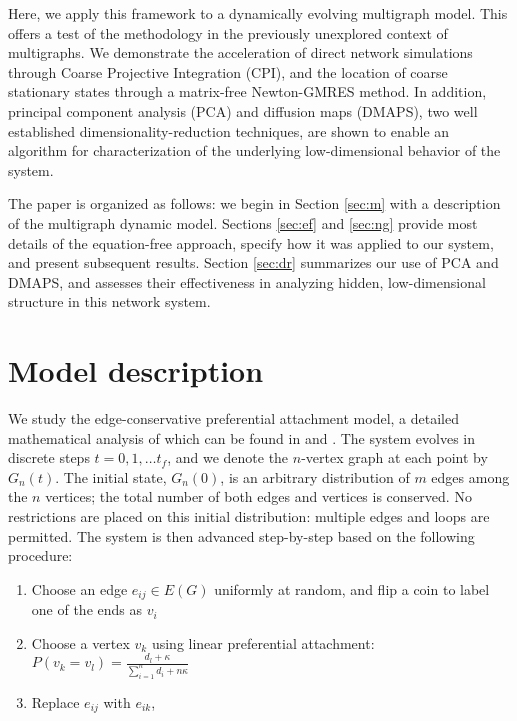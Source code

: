 Here, we apply this framework to a dynamically evolving multigraph
model.
%
This offers a test of the methodology in the previously unexplored
context of multigraphs.
%
We demonstrate the acceleration of direct network simulations through
Coarse Projective Integration (CPI), and the location of coarse
stationary states through a matrix-free Newton-GMRES method.
%
In addition, principal component analysis (PCA) and diffusion maps
(DMAPS), two well established dimensionality-reduction techniques, are
shown to enable an algorithm for characterization of the underlying
low-dimensional behavior of the system. \par

The paper is organized as follows: we begin in Section \ref{sec:m}
with a description of the multigraph dynamic model.
%
Sections \ref{sec:ef} and \ref{sec:ng} provide most details of the
equation-free approach, specify how it was applied to our system, and
present subsequent results.
%
Section \ref{sec:dr} summarizes our use of PCA and DMAPS, and assesses
their effectiveness in analyzing hidden, low-dimensional structure in
this network system.

\section{Model description\label{sec:m}}

We study the edge-conservative preferential attachment model, a
detailed mathematical analysis of which can be found in
\cite{rath_time_2012} and \cite{rath_multigraph_2012}.
%
The system evolves in discrete steps $t = 0,1,\ldots t_f$, and we
denote the $n$-vertex graph at each point by $G_n(t)$.
%
The initial state, $G_n(0)$, is an arbitrary distribution of $m$ edges
among the $n$ vertices; the total number of both edges and vertices is
conserved.
%
No restrictions are placed on this initial distribution: multiple
edges and loops are permitted.  The system is then advanced
step-by-step based on the following procedure:

\begin{enumerate}
\item Choose an edge $e_{ij} \in E(G)$ uniformly at random, and flip a
  coin to label one of the ends as $v_{i}$
\item Choose a vertex $v_{k}$ using linear preferential attachment:
  $P(v_{k} = v_{l}) = \frac{d_{l} + \kappa}{\sum\limits_{i=1}^{n}
    d_{i} + n \kappa}$
  \label{step:prob}
\item Replace $e_{ij}$ with $e_{ik}$,
\end{enumerate}

